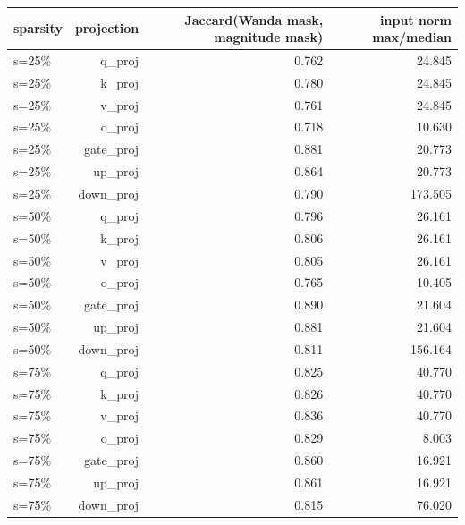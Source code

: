 \begin{tabular}{lrrr}
\toprule
sparsity & projection & Jaccard(Wanda mask, magnitude mask) & input norm max/median \\
\midrule
s=25\% & q\_proj & 0.762 & 24.845 \\
s=25\% & k\_proj & 0.780 & 24.845 \\
s=25\% & v\_proj & 0.761 & 24.845 \\
s=25\% & o\_proj & 0.718 & 10.630 \\
s=25\% & gate\_proj & 0.881 & 20.773 \\
s=25\% & up\_proj & 0.864 & 20.773 \\
s=25\% & down\_proj & 0.790 & 173.505 \\
s=50\% & q\_proj & 0.796 & 26.161 \\
s=50\% & k\_proj & 0.806 & 26.161 \\
s=50\% & v\_proj & 0.805 & 26.161 \\
s=50\% & o\_proj & 0.765 & 10.405 \\
s=50\% & gate\_proj & 0.890 & 21.604 \\
s=50\% & up\_proj & 0.881 & 21.604 \\
s=50\% & down\_proj & 0.811 & 156.164 \\
s=75\% & q\_proj & 0.825 & 40.770 \\
s=75\% & k\_proj & 0.826 & 40.770 \\
s=75\% & v\_proj & 0.836 & 40.770 \\
s=75\% & o\_proj & 0.829 & 8.003 \\
s=75\% & gate\_proj & 0.860 & 16.921 \\
s=75\% & up\_proj & 0.861 & 16.921 \\
s=75\% & down\_proj & 0.815 & 76.020 \\
\bottomrule
\end{tabular}
